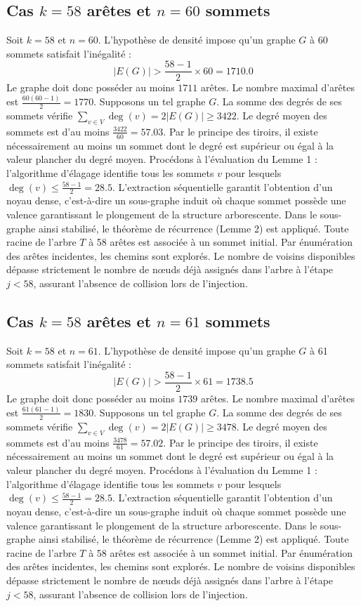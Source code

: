 \documentclass[12pt,a4paper]{article}
\begin{document}
\subsection{Cas $k = 58$ arêtes et $n = 60$ sommets}
Soit $k = 58$ et $n = 60$. L'hypothèse de densité impose qu'un graphe $G$ à 60 sommets satisfait l'inégalité :
$$ |E(G)| > \frac{58-1}{2} \times 60 = 1710.0 $$
Le graphe doit donc posséder au moins $1711$ arêtes. Le nombre maximal d'arêtes est $\frac{60(60-1)}{2} = 1770$.
Supposons un tel graphe $G$. La somme des degrés de ses sommets vérifie $\sum_{v \in V} \deg(v) = 2|E(G)| \geq 3422$.
Le degré moyen des sommets est d'au moins $\frac{3422}{60} = 57.03$.
Par le principe des tiroirs, il existe nécessairement au moins un sommet dont le degré est supérieur ou égal à la valeur plancher du degré moyen.
Procédons à l'évaluation du Lemme 1 : l'algorithme d'élagage identifie tous les sommets $v$ pour lesquels $\deg(v) \leq \frac{58-1}{2} = 28.5$.
L'extraction séquentielle garantit l'obtention d'un noyau dense, c'est-à-dire un sous-graphe induit où chaque sommet possède une valence garantissant le plongement de la structure arborescente.
Dans le sous-graphe ainsi stabilisé, le théorème de récurrence (Lemme 2) est appliqué. Toute racine de l'arbre $T$ à 58 arêtes est associée à un sommet initial. Par énumération des arêtes incidentes, les chemins sont explorés. Le nombre de voisins disponibles dépasse strictement le nombre de nœuds déjà assignés dans l'arbre à l'étape $j < 58$, assurant l'absence de collision lors de l'injection.

\subsection{Cas $k = 58$ arêtes et $n = 61$ sommets}
Soit $k = 58$ et $n = 61$. L'hypothèse de densité impose qu'un graphe $G$ à 61 sommets satisfait l'inégalité :
$$ |E(G)| > \frac{58-1}{2} \times 61 = 1738.5 $$
Le graphe doit donc posséder au moins $1739$ arêtes. Le nombre maximal d'arêtes est $\frac{61(61-1)}{2} = 1830$.
Supposons un tel graphe $G$. La somme des degrés de ses sommets vérifie $\sum_{v \in V} \deg(v) = 2|E(G)| \geq 3478$.
Le degré moyen des sommets est d'au moins $\frac{3478}{61} = 57.02$.
Par le principe des tiroirs, il existe nécessairement au moins un sommet dont le degré est supérieur ou égal à la valeur plancher du degré moyen.
Procédons à l'évaluation du Lemme 1 : l'algorithme d'élagage identifie tous les sommets $v$ pour lesquels $\deg(v) \leq \frac{58-1}{2} = 28.5$.
L'extraction séquentielle garantit l'obtention d'un noyau dense, c'est-à-dire un sous-graphe induit où chaque sommet possède une valence garantissant le plongement de la structure arborescente.
Dans le sous-graphe ainsi stabilisé, le théorème de récurrence (Lemme 2) est appliqué. Toute racine de l'arbre $T$ à 58 arêtes est associée à un sommet initial. Par énumération des arêtes incidentes, les chemins sont explorés. Le nombre de voisins disponibles dépasse strictement le nombre de nœuds déjà assignés dans l'arbre à l'étape $j < 58$, assurant l'absence de collision lors de l'injection.
\end{document}
